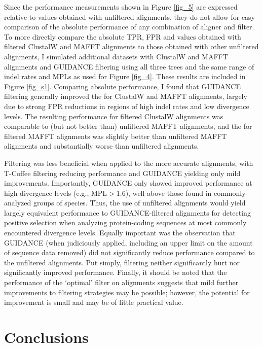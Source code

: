 Since the performance measurements shown in Figure \ref{fig_5} are
expressed relative to values obtained with unfiltered alignments, they
do not allow for easy comparison of the absolute performance of any
combination of aligner and filter. To more directly compare the
absolute TPR, FPR and \tpr values obtained with filtered ClustalW and
MAFFT alignments to those obtained with other unfiltered alignments, I
simulated additional datasets with ClustalW and MAFFT alignments and
GUIDANCE filtering using all three trees and the same range of indel
rates and MPLs as used for Figure \ref{fig_4}. These results are
included in Figure \ref{fig_s1}. Comparing absolute performance, I
found that GUIDANCE filtering generally improved the \tpr for ClustalW
and MAFFT alignments, largely due to strong FPR reductions in regions
of high indel rates and low divergence levels. The resulting \tpr
performance for filtered ClustalW alignments was comparable to (but
not better than) unfiltered MAFFT alignments, and the \tpr for
filtered MAFFT alignments was slightly better than unfiltered MAFFT
alignments and substantially worse than unfiltered \pranka alignments.


Filtering was less beneficial when applied to the more accurate
\prankc alignments, with T-Coffee filtering reducing performance and
GUIDANCE yielding only mild \tpr improvements. Importantly, GUIDANCE
only showed improved performance at high divergence levels (e.g.,
MPL$>$1.6), well above those found in commonly-analyzed groups of
species. Thus, the use of unfiltered \prankc alignments would yield
largely equivalent performance to GUIDANCE-filtered alignments for
detecting \sw positive selection when analyzing protein-coding
sequences at most commonly encountered divergence levels. Equally
important was the observation that GUIDANCE (when judiciously applied,
including an upper limit on the amount of sequence data removed) did
not significantly reduce performance compared to the unfiltered
alignments. Put simply, filtering neither significantly hurt nor
significantly improved performance. Finally, it should be noted that
the performance of the `optimal' filter on \prankc alignments suggests
that mild further improvements to filtering strategies may be
possible; however, the potential for improvement is small and may be
of little practical value.

\section{Conclusions}

